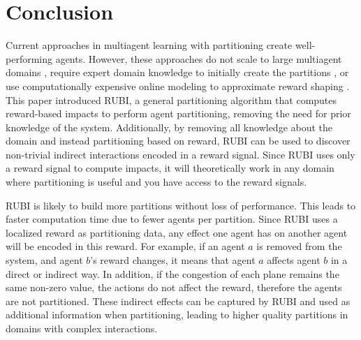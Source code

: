 \documentclass[smallcondensed]{svjour3}
\begin{document}

\section{Conclusion}

Current approaches in multiagent learning with partitioning create well-performing agents. However, these approaches do not scale to large multiagent domains \cite{Junges:2008:EPD:1402298.1402308,Modi:2005:AAD:1120120.1120127, Zhang:2010:SCD:1838206.1838304}, require expert domain knowledge to initially create the partitions \cite{Curran:2013:AHC:2484920.2485183,tumer-holmesparker_ala12,Proper:2012:MDR:2343896.2344025}, or use computationally expensive online modeling to approximate reward shaping \cite{Proper:2012:MDR:2343896.2344025}. This paper introduced RUBI, a general partitioning algorithm that computes reward-based impacts to perform agent partitioning, removing the need for prior knowledge of the system. Additionally, by removing all knowledge about the domain and instead partitioning based on reward, RUBI can be used to discover non-trivial indirect interactions encoded in a reward signal. Since RUBI uses only a reward signal to compute impacts, it will theoretically work in any domain where partitioning is useful and you have access to the reward signals.


RUBI is likely to build more partitions without loss of performance. This leads to faster computation time due to fewer agents per partition. Since RUBI uses a localized reward as partitioning data, any effect one agent has on another agent will be encoded in this reward. For example, if an agent $a$ is removed from the system, and agent $b$'s reward changes, it means that agent $a$ affects agent $b$ in a direct or indirect way. In addition, if the congestion of each plane remains the same non-zero value, the actions do not affect the reward, therefore the agents are not partitioned. These indirect effects can be captured by RUBI and used as additional information when partitioning, leading to higher quality partitions in domains with complex interactions.
\end{document}
